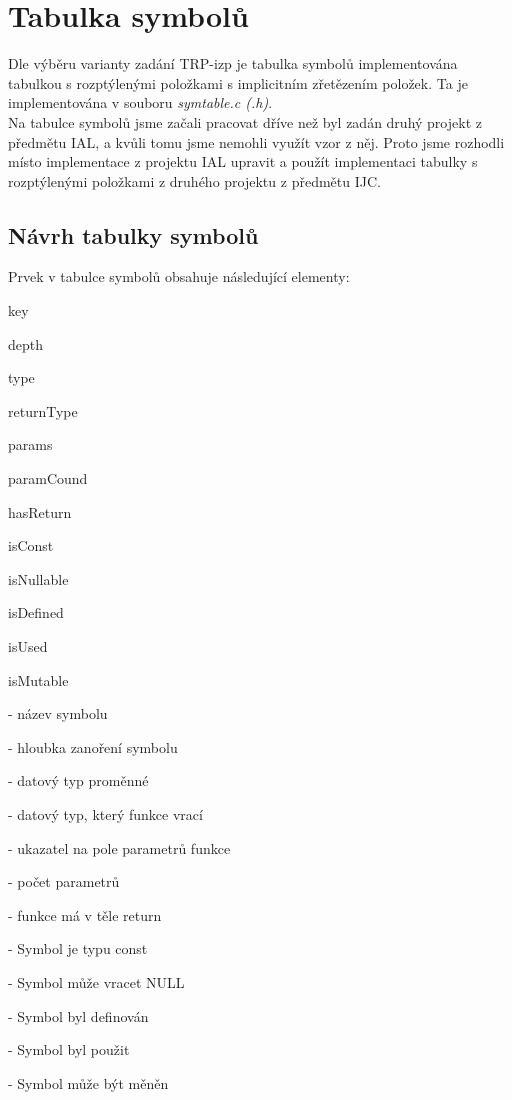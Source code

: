 \documentclass[a4paper, 12pt]{article}
\begin{document}
\newpage
{}
\section{Tabulka symbolů}
Dle výběru varianty zadání TRP-izp je tabulka symbolů implementována tabulkou s rozptýlenými položkami s implicitním zřetězením položek. Ta je implementována v souboru \textit{symtable.c (.h)}. 
\\Na tabulce symbolů jsme začali pracovat dříve než byl zadán druhý projekt z předmětu IAL, a kvůli tomu jsme nemohli využít vzor z něj. Proto jsme rozhodli místo implementace z projektu IAL upravit a použít implementaci tabulky s rozptýlenými položkami z druhého projektu z předmětu IJC.

\subsection{Návrh tabulky symbolů}
Prvek v tabulce symbolů obsahuje následující elementy:

\vspace{1cm}

\begin{itemize}
    \begin{minipage}{0.3\linewidth}   
    \item key
    \item depth
    \item type
    \item returnType
    \item params
    \item paramCound
    \item hasReturn
    \item isConst    
    \item isNullable
    \item isDefined
    \item isUsed
    \item isMutable
    \end{minipage}
    \begin{minipage}{0.65\linewidth}   
    \item[-] název symbolu
    \item[-] hloubka zanoření symbolu
    \item[-] datový typ proměnné
    \item[-] datový typ, který funkce vrací
    \item[-] ukazatel na pole parametrů funkce
    \item[-] počet parametrů
    \item[-] funkce má v těle return    
    \item[-] Symbol je typu const
    \item[-] Symbol může vracet NULL
    \item[-] Symbol byl definován
    \item[-] Symbol byl použit
    \item[-] Symbol může být měněn
    \end{minipage}
\end{itemize}
\end{document}
